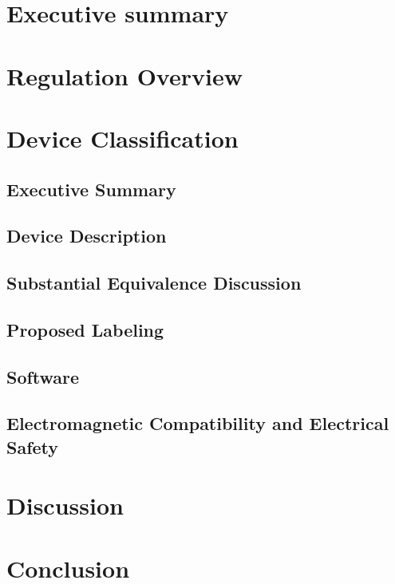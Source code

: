 \documentclass{article}
\begin{document}

\setcounter{tocdepth}{3}
\tableofcontents
\newpage

\section*{Executive summary}
\label{sec:exec-summary}

\section{Regulation Overview}
\label{sec:test-administration}

\section{Device Classification}
\label{sec:protocols}





\setcounter{subsection}{0}






\subsection{Executive Summary}
\subsection{Device Description}
\subsection{Substantial Equivalence Discussion}
\subsection{Proposed Labeling}



\subsection{Software}
\subsection{Electromagnetic Compatibility and Electrical Safety}

\section{Discussion}
\label{sec:discussion}

\section{Conclusion}
\label{sec:conclusion}


\newpage
{}


\end{document}
